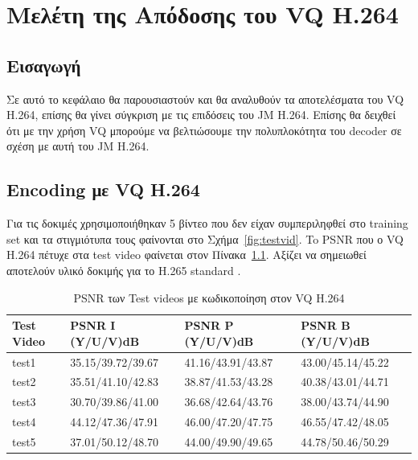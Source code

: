 ﻿\chapter{Μελέτη της Απόδοσης του VQ H.264}
\label{chapter:chap6}

\section{Εισαγωγή}
\label{section:sect61}

\indent Σε αυτό το κεφάλαιο θα παρουσιαστούν και θα αναλυθούν τα αποτελέσματα του VQ H.264, επίσης θα γίνει σύγκριση με τις επιδόσεις του JM H.264. Επίσης θα δειχθεί ότι με την χρήση VQ μπορούμε να βελτιώσουμε την πολυπλοκότητα του decoder σε σχέση με αυτή του JM H.264.

\section{Encoding με VQ H.264}
\label{section:sect62}

\indent Για τις δοκιμές χρησιμοποιήθηκαν 5 βίντεο που δεν είχαν συμπεριληφθεί στο training set και τα στιγμιότυπα τους φαίνονται στο Σχήμα~\ref{fig:testvid}. To PSNR που ο VQ H.264 πέτυχε στα test video φαίνεται στον Πίνακα~\ref{table:testpsnr}. Αξίζει να σημειωθεί αποτελούν υλικό δοκιμής για το H.265 standard \cite{misc:testvid}.

\begin{table}[h!]
    \begin{center}
        \begin{tabular}{| l | l | l | l |}
        \hline
        Test Video & PSNR I (Y/U/V)dB  & PSNR P (Y/U/V)dB  & PSNR B (Y/U/V)dB       \\ \hline
        test1      & 35.15/39.72/39.67 & 41.16/43.91/43.87 & 43.00/45.14/45.22      \\ \hline
        test2      & 35.51/41.10/42.83 & 38.87/41.53/43.28 & 40.38/43.01/44.71      \\ \hline
        test3      & 30.70/39.86/41.00 & 36.68/42.64/43.76 & 38.00/43.74/44.90      \\ \hline
        test4      & 44.12/47.36/47.91 & 46.00/47.20/47.75 & 46.55/47.42/48.05      \\ \hline
        test5      & 37.01/50.12/48.70 & 44.00/49.90/49.65 & 44.78/50.46/50.29      \\ \hline
        \hline
        \end{tabular}
    \end{center}

    \caption{PSNR των Test videos με κωδικοποίηση στον VQ H.264}
    \label{table:testpsnr}
\end{table}

